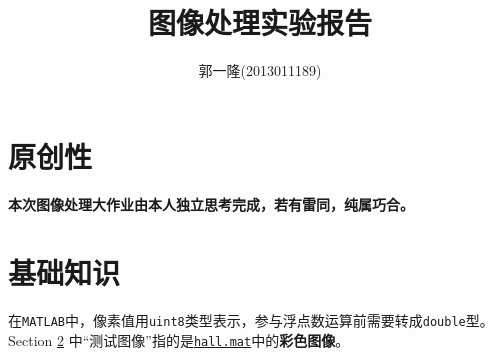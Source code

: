 \documentclass{article}
\author{郭一隆(2013011189)}
\title{图像处理实验报告}
\numberwithin{figure}{section}
\numberwithin{table}{section}
\numberwithin{listing}{section}
\numberwithin{equation}{section}
\begin{document}
    \maketitle

    \tableofcontents
    \newpage

    \listoffigures
    \listoftables
    \renewcommand\listoflistingscaption{List of Source Codes}
    \listoflistings
    \newpage

    \section{原创性} %
    \label{sec:原创性}
        
        \textbf{本次图像处理大作业由本人独立思考完成，若有雷同，纯属巧合。}


    \section{基础知识} %
    \label{sec:基础知识}

        在\texttt{MATLAB}中，像素值用\texttt{uint8}类型表示，参与浮点数运算前需要转成\texttt{double}型。Section \ref{sec:基础知识} 中“测试图像”指的是\href{run:../resource/hall.mat}{\texttt{hall.mat}}中的\textbf{彩色图像}。
\end{document}
